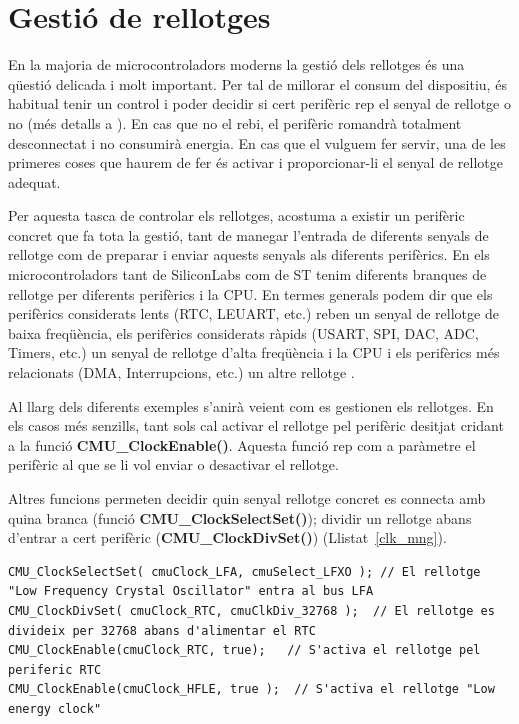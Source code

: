 \chapter{Gestió de rellotges}
\label{sec:clocks}
En la majoria de microcontroladors moderns la gestió dels rellotges és una qüestió delicada i molt important. Per tal de millorar el consum del dispositiu, és habitual tenir un control i poder decidir si cert perifèric rep el senyal de rellotge o no (més detalls a ). En cas que no el rebi, el perifèric romandrà totalment desconnectat i no consumirà energia. En cas que el vulguem fer servir, una de les primeres coses que haurem de fer és activar i proporcionar-li el senyal de rellotge adequat.

Per aquesta tasca de controlar els rellotges, acostuma a existir un perifèric concret que fa tota la gestió, tant de manegar l'entrada de diferents senyals de rellotge com de preparar i enviar aquests senyals als diferents perifèrics. En els microcontroladors tant de SiliconLabs com de ST tenim diferents branques de rellotge per diferents perifèrics i la CPU. En termes generals podem dir que els perifèrics considerats lents (RTC, LEUART, etc.) reben un senyal de rellotge de baixa freqüència, els perifèrics considerats ràpids (USART, SPI, DAC, ADC, Timers, etc.) un senyal de rellotge d'alta freqüència i la CPU i els perifèrics més relacionats (DMA, Interrupcions, etc.) un altre rellotge \cite[94]{EFM32GRM}\cite[152]{STM32F4RM}.

Al llarg dels diferents exemples s'anirà veient com es gestionen els rellotges. En els casos més senzills, tant sols cal activar el rellotge pel perifèric desitjat cridant a la funció {\bf CMU\_ClockEnable()}. Aquesta funció rep com a paràmetre el perifèric al que se li vol enviar o desactivar el rellotge.

Altres funcions permeten decidir quin senyal rellotge concret es connecta amb quina branca (funció {\bf CMU\_ClockSelectSet()}); dividir un rellotge abans d'entrar a cert perifèric ({\bf CMU\_ClockDivSet()}) (Llistat~\ref{clk_mng}).

\begin{lstlisting}[style=customc,caption={Exemple de configuració del rellotge pel RTC},label=clk_mng]
CMU_ClockSelectSet( cmuClock_LFA, cmuSelect_LFXO ); // El rellotge "Low Frequency Crystal Oscillator" entra al bus LFA
CMU_ClockDivSet( cmuClock_RTC, cmuClkDiv_32768 );  // El rellotge es divideix per 32768 abans d'alimentar el RTC
CMU_ClockEnable(cmuClock_RTC, true);   // S'activa el rellotge pel periferic RTC
CMU_ClockEnable(cmuClock_HFLE, true );  // S'activa el rellotge "Low energy clock"
\end{lstlisting}


